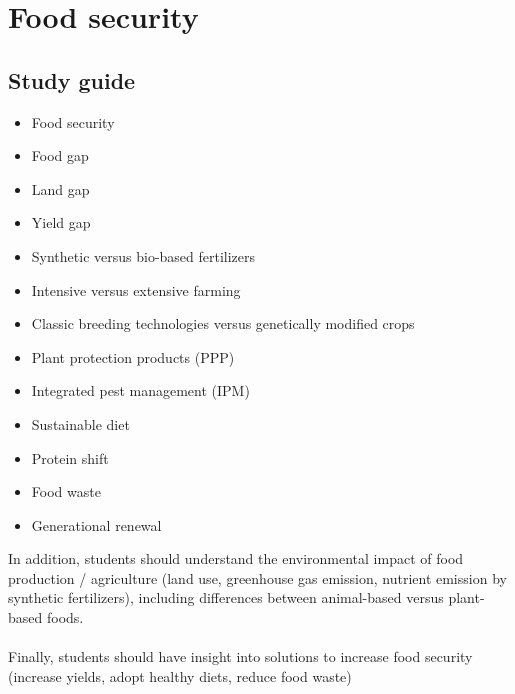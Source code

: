 \documentclass[../summary.tex]{subfiles}
\begin{document}
	
	\section{Food security}
	
	\subsection{Study guide}
	\begin{itemize} 
	Students should understand important concepts such as:
	\item Food security
	\item Food gap
	\item Land gap
	\item Yield gap
	\item Synthetic versus bio-based fertilizers
	\item Intensive versus extensive farming
	\item Classic breeding technologies versus genetically modified crops
	\item Plant protection products (PPP)
	\item Integrated pest management (IPM)
	\item Sustainable diet
	\item Protein shift
	\item Food waste
	\item Generational renewal
	\end{itemize}
	In addition, students should understand the environmental impact of food production / agriculture (land use, greenhouse gas emission, nutrient emission by synthetic fertilizers), including differences between animal-based versus plant-based foods.
	\\
	\\
	Finally, students should have insight into solutions to increase food security (increase yields, adopt healthy
	diets, reduce food waste)
	
\end{document}
